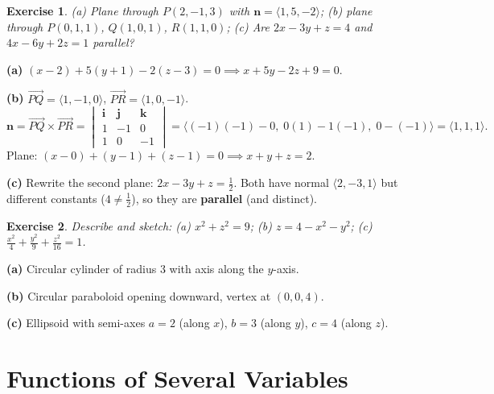 \documentclass[12pt,a4paper]{article}
\theoremstyle{exstyle}
\newtheorem{exercise}{Exercise}[section]
\begin{document}
\begin{exercise}
(a) Plane through $P(2,-1,3)$ with $\mathbf{n}=\langle 1,5,-2\rangle$;
(b) plane through $P(0,1,1)$, $Q(1,0,1)$, $R(1,1,0)$;
(c) Are $2x-3y+z=4$ and $4x-6y+2z=1$ parallel?
\end{exercise}
\begin{solbox}
\textbf{(a)} $(x-2)+5(y+1)-2(z-3)=0\implies x+5y-2z+9=0$.

\textbf{(b)} $\overrightarrow{PQ}=\langle 1,-1,0\rangle$, $\overrightarrow{PR}=\langle 1,0,-1\rangle$.
\[
  \mathbf{n}=\overrightarrow{PQ}\times\overrightarrow{PR}=
  \begin{vmatrix}\mathbf{i}&\mathbf{j}&\mathbf{k}\\1&-1&0\\1&0&-1\end{vmatrix}
  =\langle(-1)(-1)-0,\;0(1)-1(-1),\;0-(-1)\rangle=\langle 1,1,1\rangle.
\]
Plane: $(x-0)+(y-1)+(z-1)=0\implies x+y+z=2$.

\textbf{(c)} Rewrite the second plane: $2x-3y+z=\tfrac{1}{2}$.
Both have normal $\langle 2,-3,1\rangle$ but different constants ($4\neq\tfrac{1}{2}$), so they are \textbf{parallel} (and distinct).
\end{solbox}

\begin{exercise}
Describe and sketch: (a) $x^2+z^2=9$; (b) $z=4-x^2-y^2$; (c) $\frac{x^2}{4}+\frac{y^2}{9}+\frac{z^2}{16}=1$.
\end{exercise}
\begin{solbox}
\textbf{(a)} Circular cylinder of radius $3$ with axis along the $y$-axis.

\textbf{(b)} Circular paraboloid opening downward, vertex at $(0,0,4)$.

\textbf{(c)} Ellipsoid with semi-axes $a=2$ (along $x$), $b=3$ (along $y$), $c=4$ (along $z$).
\end{solbox}

\section{Functions of Several Variables}
\end{document}
